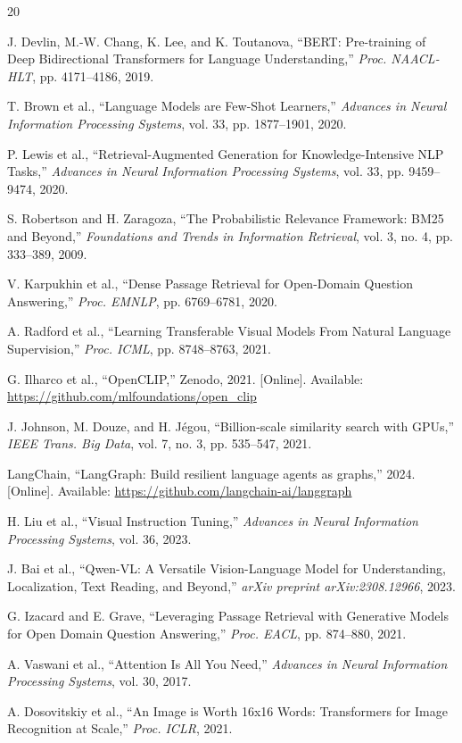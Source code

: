 \documentclass[conference]{IEEEtran}
\begin{document}
\begin{thebibliography}{20}

J. Devlin, M.-W. Chang, K. Lee, and K. Toutanova, ``BERT: Pre-training of Deep Bidirectional Transformers for Language Understanding,'' \textit{Proc. NAACL-HLT}, pp. 4171--4186, 2019.

T. Brown et al., ``Language Models are Few-Shot Learners,'' \textit{Advances in Neural Information Processing Systems}, vol. 33, pp. 1877--1901, 2020.

P. Lewis et al., ``Retrieval-Augmented Generation for Knowledge-Intensive NLP Tasks,'' \textit{Advances in Neural Information Processing Systems}, vol. 33, pp. 9459--9474, 2020.

S. Robertson and H. Zaragoza, ``The Probabilistic Relevance Framework: BM25 and Beyond,'' \textit{Foundations and Trends in Information Retrieval}, vol. 3, no. 4, pp. 333--389, 2009.

V. Karpukhin et al., ``Dense Passage Retrieval for Open-Domain Question Answering,'' \textit{Proc. EMNLP}, pp. 6769--6781, 2020.

A. Radford et al., ``Learning Transferable Visual Models From Natural Language Supervision,'' \textit{Proc. ICML}, pp. 8748--8763, 2021.

G. Ilharco et al., ``OpenCLIP,'' Zenodo, 2021. [Online]. Available: \url{https://github.com/mlfoundations/open_clip}

J. Johnson, M. Douze, and H. J\'{e}gou, ``Billion-scale similarity search with GPUs,'' \textit{IEEE Trans. Big Data}, vol. 7, no. 3, pp. 535--547, 2021.

LangChain, ``LangGraph: Build resilient language agents as graphs,'' 2024. [Online]. Available: \url{https://github.com/langchain-ai/langgraph}

H. Liu et al., ``Visual Instruction Tuning,'' \textit{Advances in Neural Information Processing Systems}, vol. 36, 2023.

J. Bai et al., ``Qwen-VL: A Versatile Vision-Language Model for Understanding, Localization, Text Reading, and Beyond,'' \textit{arXiv preprint arXiv:2308.12966}, 2023.

G. Izacard and E. Grave, ``Leveraging Passage Retrieval with Generative Models for Open Domain Question Answering,'' \textit{Proc. EACL}, pp. 874--880, 2021.

A. Vaswani et al., ``Attention Is All You Need,'' \textit{Advances in Neural Information Processing Systems}, vol. 30, 2017.

A. Dosovitskiy et al., ``An Image is Worth 16x16 Words: Transformers for Image Recognition at Scale,'' \textit{Proc. ICLR}, 2021.

\end{thebibliography}
\end{document}
